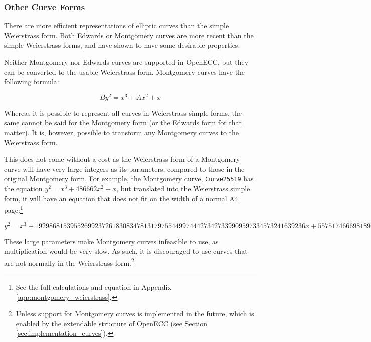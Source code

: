 \subsubsection{Other Curve Forms}

There are more efficient representations of elliptic curves than the simple
Weierstrass form. Both Edwards or Montgomery curves are more recent than the simple Weierstrass forms,
and have shown to have some desirable properties.\cite{safecurves}

Neither Montgomery nor Edwards curves are supported in OpenECC, but they can be converted to the
usable Weierstrass form. Montgomery curves have the following formula:

\begin{equation}
	By^2 = x^3 + Ax^2 + x
\end{equation}

Whereas it is possible to represent all curves in Weierstrass simple forms, the same cannot be said for
the Montgomery form (or the Edwards form for that matter). It is, however, possible to
transform any Montgomery curves to the Weierstrass form.\cite{safecurves}

This does not come without a cost as the Weierstrass form of a Montgomery curve will have
very large integers as its parameters, compared to those in the original Montgomery form. For example,
the Montgomery curve, \verb|Curve25519| has the equation \(y^2 = x^3+486662x^2+x\), but
translated into the Weierstrass simple form, it will have an equation that does not fit on the width of
a normal A4 page:\footnote{See the full calculations and equation in Appendix \ref{app:montgomery_weierstrass}.}

\begin{equation}
	y^2 =
	x^3 +
	19298681539552699237261830834781317975544997444273427339909597334573241639236x +
	55751746669818908907645289078257140818241103727901012315294400837956729358436
\end{equation}

These large parameters make Montgomery curves infeasible to use, as multiplication would be very slow. As such,
it is discouraged to use curves that are not normally in the Weierstrass form.\footnote{Unless support for Montgomery
curves is implemented in the future, which is enabled by the extendable structure of OpenECC (see Section
\ref{sec:implementation_curves}).}
